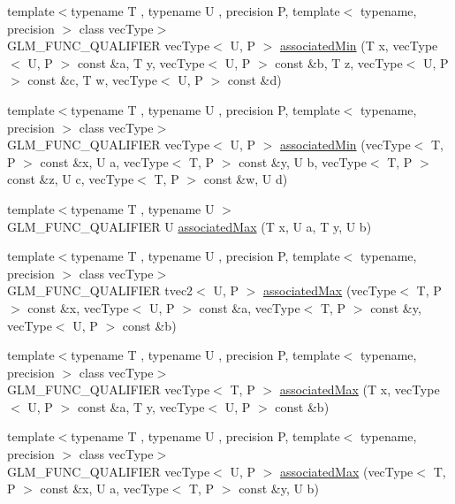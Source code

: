 \begin{DoxyCompactItemize}
\item 
{\footnotesize template$<$typename T , typename U , precision P, template$<$ typename, precision $>$ class vec\+Type$>$ }\\G\+L\+M\+\_\+\+F\+U\+N\+C\+\_\+\+Q\+U\+A\+L\+I\+F\+I\+E\+R vec\+Type$<$ U, P $>$ \hyperlink{group__gtx__associated__min__max_ga0f63b0dce5a5c3242cc6d9847e7d14f1}{associated\+Min} (T x, vec\+Type$<$ U, P $>$ const \&a, T y, vec\+Type$<$ U, P $>$ const \&b, T z, vec\+Type$<$ U, P $>$ const \&c, T w, vec\+Type$<$ U, P $>$ const \&d)
\item 
{\footnotesize template$<$typename T , typename U , precision P, template$<$ typename, precision $>$ class vec\+Type$>$ }\\G\+L\+M\+\_\+\+F\+U\+N\+C\+\_\+\+Q\+U\+A\+L\+I\+F\+I\+E\+R vec\+Type$<$ U, P $>$ \hyperlink{group__gtx__associated__min__max_ga00a949fd345f4b31b259f033d3ab4a1c}{associated\+Min} (vec\+Type$<$ T, P $>$ const \&x, U a, vec\+Type$<$ T, P $>$ const \&y, U b, vec\+Type$<$ T, P $>$ const \&z, U c, vec\+Type$<$ T, P $>$ const \&w, U d)
\item 
{\footnotesize template$<$typename T , typename U $>$ }\\G\+L\+M\+\_\+\+F\+U\+N\+C\+\_\+\+Q\+U\+A\+L\+I\+F\+I\+E\+R U \hyperlink{group__gtx__associated__min__max_ga7d9c8785230c8db60f72ec8975f1ba45}{associated\+Max} (T x, U a, T y, U b)
\item 
{\footnotesize template$<$typename T , typename U , precision P, template$<$ typename, precision $>$ class vec\+Type$>$ }\\G\+L\+M\+\_\+\+F\+U\+N\+C\+\_\+\+Q\+U\+A\+L\+I\+F\+I\+E\+R tvec2$<$ U, P $>$ \hyperlink{group__gtx__associated__min__max_ga10ba6001798f42a0f941f19ff30e066a}{associated\+Max} (vec\+Type$<$ T, P $>$ const \&x, vec\+Type$<$ U, P $>$ const \&a, vec\+Type$<$ T, P $>$ const \&y, vec\+Type$<$ U, P $>$ const \&b)
\item 
{\footnotesize template$<$typename T , typename U , precision P, template$<$ typename, precision $>$ class vec\+Type$>$ }\\G\+L\+M\+\_\+\+F\+U\+N\+C\+\_\+\+Q\+U\+A\+L\+I\+F\+I\+E\+R vec\+Type$<$ T, P $>$ \hyperlink{group__gtx__associated__min__max_ga62ca63cca6b21387b8a25474f441a869}{associated\+Max} (T x, vec\+Type$<$ U, P $>$ const \&a, T y, vec\+Type$<$ U, P $>$ const \&b)
\item 
{\footnotesize template$<$typename T , typename U , precision P, template$<$ typename, precision $>$ class vec\+Type$>$ }\\G\+L\+M\+\_\+\+F\+U\+N\+C\+\_\+\+Q\+U\+A\+L\+I\+F\+I\+E\+R vec\+Type$<$ U, P $>$ \hyperlink{group__gtx__associated__min__max_ga5364520173815b66a9d9e452c38bf312}{associated\+Max} (vec\+Type$<$ T, P $>$ const \&x, U a, vec\+Type$<$ T, P $>$ const \&y, U b)

\end{DoxyCompactItemize}
